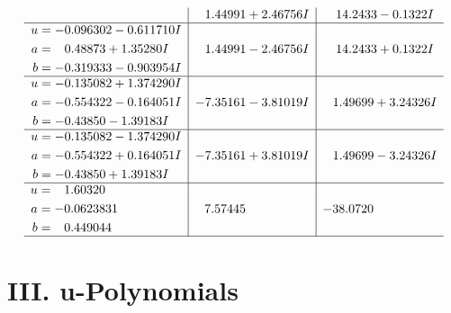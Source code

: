 \documentclass[1p]{elsarticle_modified}
\theoremstyle{definition}
\begin{document}
$$\begin{array}{c|c|c}
 & \phantom{-}1.44991 + 2.46756 I & \phantom{-}14.2433 - 0.1322 I \\ \hline\begin{aligned}
u &= -0.096302 - 0.611710 I \\
a &= \phantom{-}0.48873 + 1.35280 I \\
b &= -0.319333 - 0.903954 I\end{aligned}
 & \phantom{-}1.44991 - 2.46756 I & \phantom{-}14.2433 + 0.1322 I \\ \hline\begin{aligned}
u &= -0.135082 + 1.374290 I \\
a &= -0.554322 - 0.164051 I \\
b &= -0.43850 - 1.39183 I\end{aligned}
 & -7.35161 - 3.81019 I & \phantom{-}1.49699 + 3.24326 I \\ \hline\begin{aligned}
u &= -0.135082 - 1.374290 I \\
a &= -0.554322 + 0.164051 I \\
b &= -0.43850 + 1.39183 I\end{aligned}
 & -7.35161 + 3.81019 I & \phantom{-}1.49699 - 3.24326 I \\ \hline\begin{aligned}
u &= \phantom{-}1.60320\phantom{ +0.000000I} \\
a &= -0.0623831\phantom{ +0.000000I} \\
b &= \phantom{-}0.449044\phantom{ +0.000000I}\end{aligned}
 & \phantom{-}7.57445\phantom{ +0.000000I} & -38.0720\phantom{ +0.000000I}\\
 \hline 
 \end{array}$$\newpage
\newpage\renewcommand{\arraystretch}{1}
\centering \section*{ III. u-Polynomials}
\end{document}
